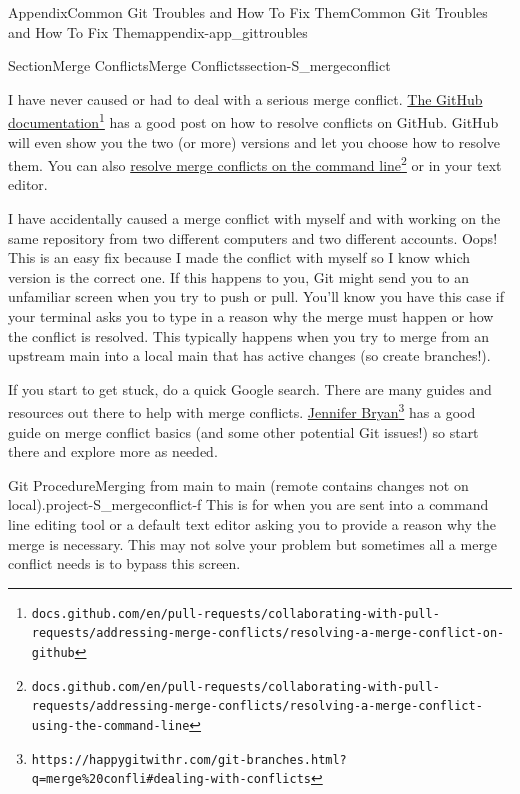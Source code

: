 \documentclass[oneside,10pt,]{book}
\begin{document}
\begin{appendixptx}{Appendix}{Common Git Troubles and How To Fix Them}{}{Common Git Troubles and How To Fix Them}{}{}{appendix-app_gittroubles}
\begin{sectionptx}{Section}{Merge Conflicts}{}{Merge Conflicts}{}{}{section-S_mergeconflict}
\par
I have never caused or had to deal with a serious merge conflict. \href{https://docs.github.com/en/pull-requests/collaborating-with-pull-requests/addressing-merge-conflicts/resolving-a-merge-conflict-on-github}{The GitHub documentation}\footnote{\nolinkurl{docs.github.com/en/pull-requests/collaborating-with-pull-requests/addressing-merge-conflicts/resolving-a-merge-conflict-on-github}\label{fn-S_mergeconflict-c-b}} has a good post on how to resolve conflicts on GitHub. GitHub will even show you the two (or more) versions and let you choose how to resolve them. You can also \href{https://docs.github.com/en/pull-requests/collaborating-with-pull-requests/addressing-merge-conflicts/resolving-a-merge-conflict-using-the-command-line}{resolve merge conflicts on the command line}\footnote{\nolinkurl{docs.github.com/en/pull-requests/collaborating-with-pull-requests/addressing-merge-conflicts/resolving-a-merge-conflict-using-the-command-line}\label{fn-S_mergeconflict-c-d}} or in your text editor.%
\par
I have accidentally caused a merge conflict with myself and with working on the same repository from two different computers and two different accounts. Oops! This is an easy fix because I made the conflict with myself so I know which version is the correct one. If this happens to you, Git might send you to an unfamiliar screen when you try to push or pull. You'll know you have this case if your terminal asks you to type in a reason why the merge must happen or how the conflict is resolved. This typically happens when you try to merge from an upstream main into a local main that has active changes (so create branches!).%
\par
If you start to get stuck, do a quick Google search. There are many guides and resources out there to help with merge conflicts. \href{https://happygitwithr.com/git-branches.html?q=merge\%20confli\#dealing-with-conflicts}{Jennifer Bryan}\footnote{\nolinkurl{https://happygitwithr.com/git-branches.html?q=merge\%20confli\#dealing-with-conflicts}\label{fn-S_mergeconflict-e-b}} has a good guide on merge conflict basics (and some other potential Git issues!) so start there and explore more as needed.%
\begin{project}{Git Procedure}{Merging from main to main (remote contains changes not on local).}{project-S_mergeconflict-f}%
This is for when you are sent into a command line editing tool or a default text editor asking you to provide a reason why the merge is necessary. This may not solve your problem but sometimes all a merge conflict needs is to bypass this screen.%

\end{project}
\end{sectionptx}
\end{appendixptx}
\end{document}

